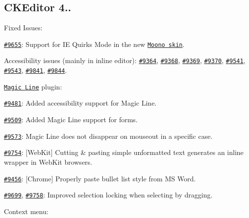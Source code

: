 {\ttfamily \subsection*{C\+K\+Editor 4..}}

{\ttfamily }

{\ttfamily Fixed Issues\+:}

{\ttfamily 
\begin{DoxyItemize}
\item \href{http://dev.ckeditor.com/ticket/9655}{\tt \#9655}\+: Support for IE Quirks Mode in the new \href{http://ckeditor.com/addon/moono}{\tt Moono skin}.
\item Accessibility issues (mainly in inline editor)\+: \href{http://dev.ckeditor.com/ticket/9364}{\tt \#9364}, \href{http://dev.ckeditor.com/ticket/9368}{\tt \#9368}, \href{http://dev.ckeditor.com/ticket/9369}{\tt \#9369}, \href{http://dev.ckeditor.com/ticket/9370}{\tt \#9370}, \href{http://dev.ckeditor.com/ticket/9541}{\tt \#9541}, \href{http://dev.ckeditor.com/ticket/9543}{\tt \#9543}, \href{http://dev.ckeditor.com/ticket/9841}{\tt \#9841}, \href{http://dev.ckeditor.com/ticket/9844}{\tt \#9844}.
\item \href{http://ckeditor.com/addon/magicline}{\tt Magic Line} plugin\+:
\begin{DoxyItemize}
\item \href{http://dev.ckeditor.com/ticket/9481}{\tt \#9481}\+: Added accessibility support for Magic Line.
\item \href{http://dev.ckeditor.com/ticket/9509}{\tt \#9509}\+: Added Magic Line support for forms.
\item \href{http://dev.ckeditor.com/ticket/9573}{\tt \#9573}\+: Magic Line does not disappear on {\ttfamily mouseout} in a specific case.
\end{DoxyItemize}
\item \href{http://dev.ckeditor.com/ticket/9754}{\tt \#9754}\+: \mbox{[}Web\+Kit\mbox{]} Cutting \& pasting simple unformatted text generates an inline wrapper in Web\+Kit browsers.
\item \href{http://dev.ckeditor.com/ticket/9456}{\tt \#9456}\+: \mbox{[}Chrome\mbox{]} Properly paste bullet list style from MS Word.
\item \href{http://dev.ckeditor.com/ticket/9699}{\tt \#9699}, \href{http://dev.ckeditor.com/ticket/9758}{\tt \#9758}\+: Improved selection locking when selecting by dragging.
\item Context menu\+:
\begin{DoxyItemize}

\end{DoxyItemize}
\end{DoxyItemize}}
